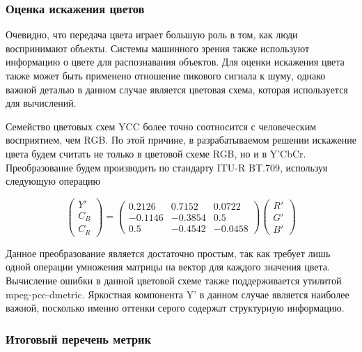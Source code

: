 \subsubsection{Оценка искажения цветов}


Очевидно, что передача цвета играет большую роль в том, как люди воспринимают
объекты. Системы машинного зрения также используют информацию о цвете для
распознавания объектов\cite{SelfDriving}. Для оценки искажения цвета также может
быть применено отношение пикового сигнала к шуму, однако важной деталью в данном
случае является цветовая схема, которая используется для вычислений.

Семейство цветовых схем YCC более точно соотносится с человеческим восприятием,
чем RGB\cite[291]{Poynton2001-sf}. По этой причине, в разрабатываемом решении
искажение цвета будем считать не только в цветовой схеме RGB, но и в Y'CbCr.
Преобразование будем производить по стандарту ITU-R BT.709, используя следующую
операцию

\begin{equation} \label{eq:itu_ycc}
    \begin{pmatrix}
        Y' \\
        C_{B} \\
        C_{R}
    \end{pmatrix} = \begin{pmatrix}
        0.2126 & 0.7152 & 0.0722 \\
        -0.1146 & -0.3854 & 0.5 \\
        0.5 & -0.4542 & -0.0458
    \end{pmatrix} \begin{pmatrix}
        R' \\
        G' \\
        B'
    \end{pmatrix}
\end{equation}

Данное преобразование является достаточно простым, так как требует лишь одной
операции умножения матрицы на вектор для каждого значения цвета. Вычисление
ошибки в данной цветовой схеме также поддерживается утилитой mpeg-pcc-dmetric.
Яркостная компонента Y' в данном случае является наиболее важной, посколько
именно оттенки серого содержат структурную информацию.

\subsubsection{Итоговый перечень метрик}

